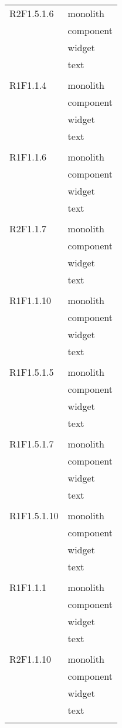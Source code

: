 \begin{center}
\begin{longtable}{|p{7cm}|p{5cm}|}
		R2F1.5.1.6 & monolith \\ & component \\ & widget \\ & text \\ & \\ \hline
		R1F1.1.4 & monolith \\ & component \\ & widget \\ & text \\ & \\ \hline
		R1F1.1.6 & monolith \\ & component \\ & widget \\ & text \\ & \\ \hline
		R2F1.1.7 & monolith \\ & component \\ & widget \\ & text \\ & \\ \hline
		R1F1.1.10 & monolith \\ & component \\ & widget \\ & text \\ & \\ \hline
		R1F1.5.1.5 & monolith \\ & component \\ & widget \\ & text \\ & \\ \hline
		R1F1.5.1.7 & monolith \\ & component \\ & widget \\ & text \\ & \\ \hline
		R1F1.5.1.10 & monolith \\ & component \\ & widget \\ & text \\ & \\ \hline
		R1F1.1.1 & monolith \\ & component \\ & widget \\ & text \\ & \\ \hline
		R2F1.1.10 & monolith \\ & component \\ & widget \\ & text \\ & \\ \hline

\end{longtable}
\end{center}
